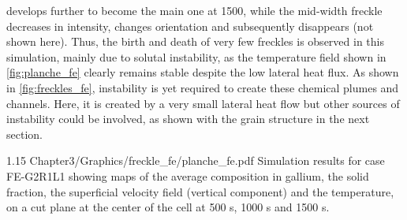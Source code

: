 develops further to become the main one at \SI{1500}{\utime}, while the mid-width freckle decreases in intensity, changes 
orientation and subsequently disappears (not shown here). Thus, the birth and death of very few freckles is observed in this 
simulation, mainly due to solutal instability, as the temperature field shown in \cref{fig:planche_fe} clearly remains stable despite 
the low lateral heat flux. As shown in \cref{fig:freckles_fe}, instability is yet required to create these chemical plumes and channels. 
Here, it is created by a very small lateral heat flow but other sources of instability could be involved, as shown with the grain structure in the next section.
%
\begin{landscape}
\begin{figureth}
{1.15}
{Chapter3/Graphics/freckle_fe/planche_fe.pdf}
{Simulation results for case FE-G2R1L1 showing maps of the average composition in gallium,
the solid fraction, the superficial velocity field (vertical component) and the temperature, 
on a cut plane at the center of the cell at 500 s, 1000 s and 1500 s.}
\label{fig:planche_fe}
\end{figureth}
\end{landscape}
%
